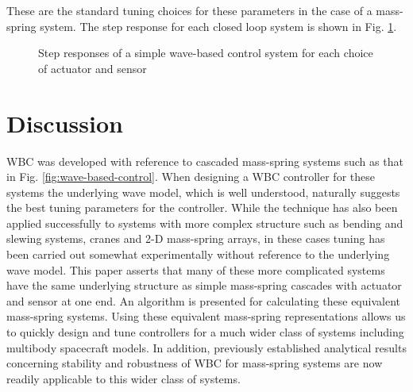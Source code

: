 \documentclass{mbd_fullpaper}
\begin{document}
These are the standard tuning choices for these parameters in the case of a mass-spring system.
The step response for each closed loop system is shown in Fig. \ref{fig:graphs}.
\begin{figure}[]
  \begin{center}
    \subfigure[]{ \label{fig:graphdel}}   
    \subfigure[]{ \label{fig:graphf2}}
	\subfigure[]{ \label{fig:graphf3}}
    \caption{Step responses of a simple wave-based control system for each choice of actuator and sensor \label{fig:graphs}}
  \end{center}
\end{figure}

\section{Discussion}
\label{sec:discussion}
WBC was developed with reference to cascaded mass-spring systems such as that in Fig. \ref{fig:wave-based-control}.
When designing a WBC controller for these systems the underlying wave model, which is well understood, naturally suggests the best tuning parameters for the controller.
While the technique has also been applied successfully to systems with more complex structure such as bending and slewing systems, cranes and 2-D mass-spring arrays, in these cases tuning has been carried out somewhat experimentally without reference to the underlying wave model.
This paper asserts that many of these more complicated systems have the same underlying structure as simple mass-spring cascades with actuator and sensor at one end.
An algorithm is presented for calculating these equivalent mass-spring systems.
Using these equivalent mass-spring representations allows us to quickly design and tune controllers for a much wider class of systems including multibody spacecraft models.
In addition, previously established analytical results concerning stability and robustness of WBC for mass-spring systems are now readily applicable to this wider class of systems.
\end{document}
